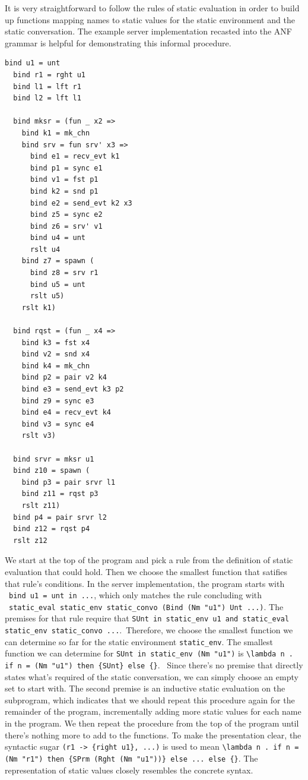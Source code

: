 \documentclass[10pt]{article}
\begin{document}
It is very straightforward to follow the rules of static evaluation in order to build up
functions mapping names to static values for the static environment
and the static conversation.
The example server implementation recasted into the
ANF grammar is helpful for demonstrating this
informal procedure.

\begin{lstlisting}[language=normal_lang, mathescape]
  bind u1 = unt
  bind r1 = rght u1
  bind l1 = lft r1
  bind l2 = lft l1

  bind mksr = (fun _ x2 => 
    bind k1 = mk_chn
    bind srv = fun srv' x3 =>
      bind e1 = recv_evt k1
      bind p1 = sync e1
      bind v1 = fst p1
      bind k2 = snd p1 
      bind e2 = send_evt k2 x3
      bind z5 = sync e2
      bind z6 = srv' v1
      bind u4 = unt
      rslt u4
    bind z7 = spawn (
      bind z8 = srv r1
      bind u5 = unt
      rslt u5)
    rslt k1)

  bind rqst = (fun _ x4 =>
    bind k3 = fst x4
    bind v2 = snd x4
    bind k4 = mk_chn
    bind p2 = pair v2 k4
    bind e3 = send_evt k3 p2
    bind z9 = sync e3
    bind e4 = recv_evt k4
    bind v3 = sync e4
    rslt v3)

  bind srvr = mksr u1
  bind z10 = spawn ( 
    bind p3 = pair srvr l1
    bind z11 = rqst p3
    rslt z11)
  bind p4 = pair srvr l2
  bind z12 = rqst p4
  rslt z12
  \end{lstlisting}


We start at the top of the program and pick a
rule from the definition of static evaluation that
could hold. Then we choose the smallest function that satifies that rule's conditions. 
In the server implementation, the program starts with \
\lstinline[language=normal_lang, mathescape]{bind u1 = unt in ...}, which only matches
the rule concluding with \
\lstinline[language=logic, mathescape]{static_eval static_env static_convo (Bind (Nm "u1") Unt ...)}. 
The premises for that rule require that 
\lstinline[language=logic, mathescape]{SUnt in static_env u1 and static_eval static_env static_convo ...}.\
Therefore, we choose the smallest function we can determine so far for the static environment
\lstinline{static_env}. The smallest function we can determine for 
\lstinline[language=logic]{SUnt in static_env (Nm "u1")} is 
\lstinline[language=logic]|\lambda n . if n = (Nm "u1") then {SUnt} else {}|. \
Since
there's no premise that directly states what's required of the static conversation, we can
simply choose an empty set to start with. The second premise is an inductive static evaluation on
the subprogram, which indicates that we should repeat this procedure again for the remainder of
the program, incrementally adding more static values for each name in the program.  We then repeat
the procedure from the top of the program until there's nothing more to add to the functions.
To make the presentation clear, the syntactic sugar \lstinline|(r1 -> {right u1}, ...)| is used 
to mean
\lstinline[language=logic]|\lambda n . if n = (Nm "r1") then {SPrm (Rght (Nm "u1"))} else ... else {}|.
The representation of static values closely resembles the concrete syntax.
\end{document}
